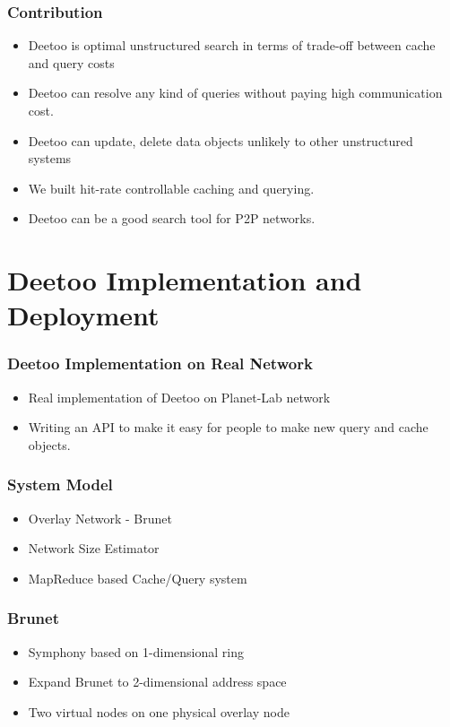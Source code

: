 \documentclass[red]{beamer}
\begin{document}
\begin{frame}
\frametitle{Contribution}

\begin{itemize}
\item
Deetoo is optimal unstructured search in terms of trade-off between cache and query costs  
\item
Deetoo can resolve any kind of queries without paying high communication cost.
\item Deetoo can update, delete data objects unlikely to other unstructured systems
\item
We built hit-rate controllable caching and querying.
\item
Deetoo can be a good search tool for P2P networks.
\end{itemize}
\end{frame}

\section{Deetoo Implementation and Deployment}
\begin{frame}
\frametitle{Deetoo Implementation on Real Network}
\begin{itemize}
\item Real implementation of Deetoo on Planet-Lab network
\item Writing an API to make it easy for people to make new query and cache objects.
\end{itemize}
\end{frame}

\begin{frame}
\frametitle{System Model}
\begin{itemize}
\item Overlay Network - Brunet
\item Network Size Estimator
\item MapReduce based Cache/Query system
\end{itemize}
\end{frame}

\begin{frame}
\frametitle{Brunet}
\begin{itemize}
\item Symphony based on 1-dimensional ring 
\item Expand Brunet to 2-dimensional address space
\item Two virtual nodes on one physical overlay node
\end{itemize}
\end{frame}
\end{document}
